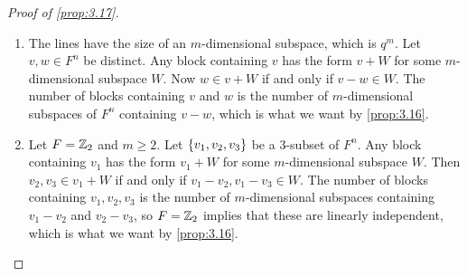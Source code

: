 \begin{proof}[Proof of \ref{prop:3.17}]
\hfill
\begin{enumerate}
\item The lines have the size of an $ m $-dimensional subspace, which is $ q^m $. Let $ v, w \in F^n $ be distinct. Any block containing $ v $ has the form $ v + W $ for some $ m $-dimensional subspace $ W $. Now $ w \in v + W $ if and only if $ v - w \in W $. The number of blocks containing $ v $ and $ w $ is the number of $ m $-dimensional subspaces of $ F^n $ containing $ v - w $, which is what we want by \ref{prop:3.16}.
\item Let $ F = \mathbb{Z}_2 $ and $ m \ge 2 $. Let $ \cbr{v_1, v_2, v_3} $ be a $ 3 $-subset of $ F^n $. Any block containing $ v_1 $ has the form $ v_1 + W $ for some $ m $-dimensional subspace $ W $. Then $ v_2, v_3 \in v_1 + W $ if and only if $ v_1 - v_2, v_1 - v_3 \in W $. The number of blocks containing $ v_1, v_2, v_3 $ is the number of $ m $-dimensional subspaces containing $ v_1 - v_2 $ and $ v_2 - v_3 $, so $ F = \mathbb{Z}_2 $ implies that these are linearly independent, which is what we want by \ref{prop:3.16}.
\end{enumerate}
\end{proof}

